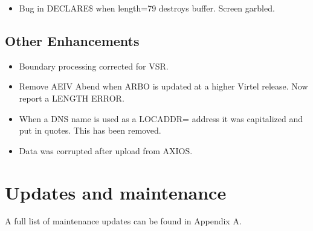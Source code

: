 \documentclass[letterpaper,10pt,english]{sphinxmanual}
\begin{document}
\begin{itemize}
\item {} 
Bug in DECLARE\$ when length=79 destroys buffer. Screen garbled.

\end{itemize}

\newpage


\section{Other Enhancements}
\label{\detokenize{TN202101:other-enhancements}}
\begin{itemize}
\item {} 
Boundary processing corrected for VSR.

\end{itemize}

\begin{itemize}
\item {} 
Remove AEIV Abend when ARBO is updated at a higher Virtel release. Now report a LENGTH ERROR.

\end{itemize}

\begin{itemize}
\item {} 
When a DNS name is used as a LOCADDR= address it was capitalized and put in quotes. This has been removed.

\end{itemize}

\begin{itemize}
\item {} 
Data was corrupted after upload from AXIOS.

\end{itemize}


\chapter{Updates and maintenance}
\label{\detokenize{TN202101:updates-and-maintenance}}
A full list of maintenance updates can be found in Appendix A.

\newpage
\end{document}
